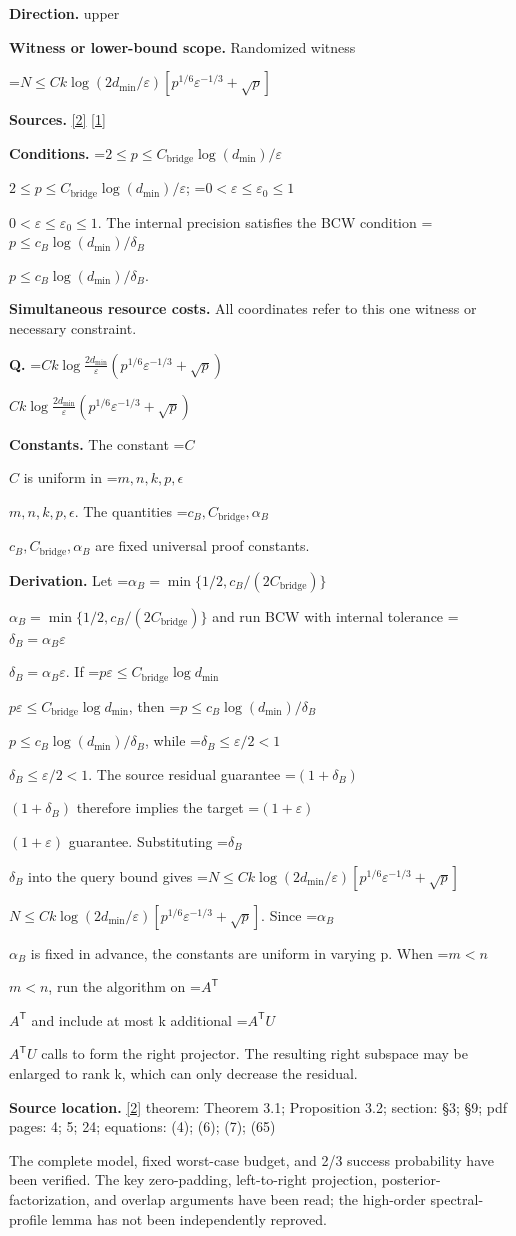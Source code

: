 \documentclass[10pt,a4paper]{article}
\newcommand{\AtlasMath}[1]{\par\begingroup\centering\setbox0=\hbox{$\displaystyle #1$}\ifdim\wd0>1.4\linewidth\typeout{ATLAS WIDE FORMULA: \the\wd0}\fi\ifdim\wd0>\linewidth\resizebox{\linewidth}{!}{\box0}\else\box0\fi\par\endgroup}
\newcommand{\AtlasInlineMath}[1]{\begingroup\setbox0=\hbox{$#1$}\ifdim\wd0>.4\linewidth\endgroup\AtlasMath{#1}\else\endgroup$#1$\fi}
\begin{document}
\textbf{Direction.} upper

\textbf{Witness or lower-bound scope.} Randomized witness

\AtlasMath{N\le Ck\log(2d_{\mathrm{min}}/\varepsilon)\left[p^{1/6}\varepsilon^{-1/3}+\sqrt{p}\right]}
\textbf{Sources.} \href{https://arxiv.org/pdf/2609.35840v2}{[2]} \href{https://arxiv.org/pdf/2202.05120v4}{[1]}

\textbf{Conditions.} \AtlasInlineMath{2\le p\le C_{\mathrm{bridge}}\log(d_{\mathrm{min}})/\varepsilon}; \AtlasInlineMath{0<\varepsilon\le\varepsilon_0\le1}. The internal precision satisfies the BCW condition \AtlasInlineMath{p\le c_B\log(d_{\mathrm{min}})/\delta_B}.

\textbf{Simultaneous resource costs.} All coordinates refer to this one witness or necessary constraint.

\textbf{Q.} \AtlasInlineMath{Ck\log\!\frac{2d_{\mathrm{min}}}{\varepsilon}\left(p^{1/6}\varepsilon^{-1/3}+\sqrt p\right)}

\textbf{Constants.} The constant \AtlasInlineMath{C} is uniform in \AtlasInlineMath{m,n,k,p,\epsilon}. The quantities \AtlasInlineMath{c_B,C_{\mathrm{bridge}},\alpha_B} are fixed universal proof constants.

\textbf{Derivation.} Let \AtlasInlineMath{\alpha_B=\min\{1/2,c_B/(2C_{\mathrm{bridge}})\}} and run BCW with internal tolerance \AtlasInlineMath{\delta_B=\alpha_B\varepsilon}. If \AtlasInlineMath{p\varepsilon\le C_{\mathrm{bridge}}\log d_{\mathrm{min}}}, then \AtlasInlineMath{p\le c_B\log(d_{\mathrm{min}})/\delta_B}, while \AtlasInlineMath{\delta_B\le\varepsilon/2<1}. The source residual guarantee \AtlasInlineMath{(1+\delta_B)} therefore implies the target \AtlasInlineMath{(1+\varepsilon)} guarantee. Substituting \AtlasInlineMath{\delta_B} into the query bound gives \AtlasInlineMath{N\le Ck\log(2d_{\mathrm{min}}/\varepsilon)[p^{1/6}\varepsilon^{-1/3}+\sqrt p]}. Since \AtlasInlineMath{\alpha_B} is fixed in advance, the constants are uniform in varying p. When \AtlasInlineMath{m<n}, run the algorithm on \AtlasInlineMath{A^{\mathsf T}} and include at most k additional \AtlasInlineMath{A^{\mathsf T}U} calls to form the right projector. The resulting right subspace may be enlarged to rank k, which can only decrease the residual.

\textbf{Source location.} \href{https://arxiv.org/pdf/2609.35840v2}{[2]} theorem: Theorem 3.1; Proposition 3.2; section: §3; §9; pdf pages: 4; 5; 24; equations: (4); (6); (7); (65)

The complete model, fixed worst-case budget, and 2/3 success probability have been verified. The key zero-padding, left-to-right projection, posterior-factorization, and overlap arguments have been read; the high-order spectral-profile lemma has not been independently reproved.
\end{document}
